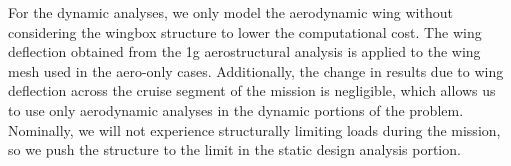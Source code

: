 For the dynamic analyses, we only model the aerodynamic wing without considering the wingbox structure to lower the computational cost.
The wing deflection obtained from the 1g aerostructural analysis is applied to the wing mesh used in the aero-only cases.
Additionally, the change in results due to wing deflection across the cruise segment of the mission is negligible, which allows us to use only aerodynamic analyses in the dynamic portions of the problem.
Nominally, we will not experience structurally limiting loads during the mission, so we push the structure to the limit in the static design analysis portion.
